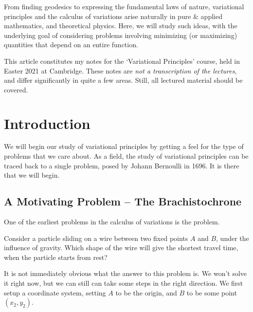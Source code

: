 



From finding geodesics to expressing the fundamental laws of nature, variational principles and the calculus of variations arise naturally in pure \& applied mathematics, and theoretical physics.
Here, we will study such ideas, with the underlying goal of considering problems involving minimizing (or maximizing) quantities that depend on an entire function. 

This article constitutes my notes for the `Variational Principles' course, held in Easter 2021 at Cambridge. These notes are \emph{not a transcription of the lectures}, and differ significantly in quite a few areas. Still, all lectured material should be covered.




\section{Introduction}



We will begin our study of variational principles by getting a feel for the type of problems that we care about. 
As a field, the study of variational principles can be traced back to a single problem, posed by Johann Bernoulli in 1696. It is there that we will begin.

\subsection{A Motivating Problem -- The Brachistochrone}

One of the earliest problems in the calculus of variations is the  problem.

\begin{example}[Brachistochrone]
	Consider a particle sliding on a wire between two fixed points $A$ and $B$, under the influence of gravity. Which shape of the wire will give the shortest travel time, when the particle starts from rest?
\end{example}

It is not immediately obvious what the answer to this problem is. We won't solve it right now, but we can still can take some steps in the right direction. We first setup a coordinate system, setting $A$ to be the origin, and $B$ to be some point $(x_2, y_2)$.


